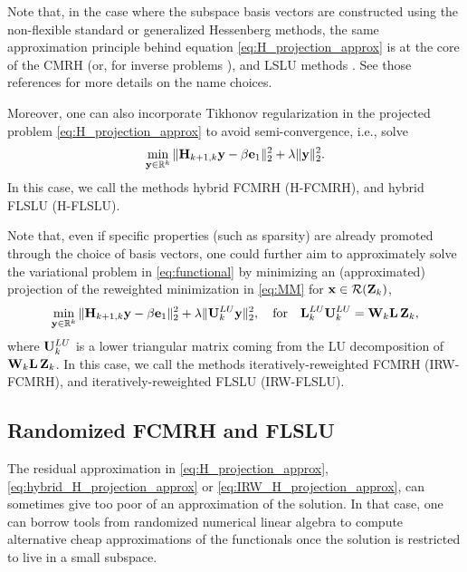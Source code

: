 \documentclass[11pt]{article}
\numberwithin{equation}{section}
\newcommand{\bfA}{{\bf A}}
\newcommand{\bfH}{{\bf H}}
\newcommand{\bfL}{{\bf L}}
\newcommand{\bfU}{{\bf U}}
\newcommand{\bfW}{{\bf W}}
\newcommand{\bfZ}{{\bf Z}}
\newcommand{\bfb}{{\bf b}}
\newcommand{\bfe}{{\bf e}}
\newcommand{\bfx}{{\bf x}}
\newcommand{\bfy}{{\bf y}}
\begin{document}
Note that, in the case where the subspace basis vectors are constructed using the non-flexible standard or generalized Hessenberg methods, the same approximation principle behind equation \eqref{eq:H_projection_approx} is at the core of the CMRH \cite{sadok1999new,sadok2012new} (or, for inverse problems \cite{brown2024hcmrh}), and LSLU methods \cite{brown2025hlslu}. See those references for more details on the name choices.

Moreover, one can also incorporate Tikhonov regularization in the projected problem \eqref{eq:H_projection_approx} to avoid semi-convergence, i.e., solve
\begin{equation}\label{eq:hybrid_H_projection_approx}
   \min_{\bfy\in\mathbb{R}^k} \| \bfH_{k+1,k}\bfy -\beta \bfe_1 \|_2^2+\lambda\|\bfy\|_2^2.
\end{equation}
In this case, we call the methods hybrid FCMRH (H-FCMRH), and hybrid FLSLU (H-FLSLU).

Note that, even if specific properties (such as sparsity) are already promoted through the choice of basis vectors, one could further aim to approximately solve the variational problem in \eqref{eq:functional} by minimizing an (approximated) projection of the reweighted minimization in \eqref{eq:MM} for $\bfx \in \mathcal{R}(\bfZ_k)$,
\begin{equation}\label{eq:IRW_H_projection_approx}
   \min_{\bfy\in\mathbb{R}^k} \| \bfH_{k+1,k}\bfy -\beta \bfe_1 \|_2^2+\lambda\|\bfU^{LU}_k\bfy\|_2^2, \quad \text{for} \quad \bfL^{LU}_k\bfU^{LU}_k = \bfW_k \bfL\,\bfZ_k,
\end{equation}
where $\bfU^{LU}_k$ is a lower triangular matrix coming from the LU decomposition of $\bfW_k \bfL\,\bfZ_k$.
In this case, we call the methods iteratively-reweighted FCMRH (IRW-FCMRH), and iteratively-reweighted FLSLU (IRW-FLSLU).

\subsection{Randomized FCMRH and FLSLU}
The residual approximation in \eqref{eq:H_projection_approx},  \eqref{eq:hybrid_H_projection_approx} or \eqref{eq:IRW_H_projection_approx}, can sometimes give too poor of an approximation of the solution. In that case, one can borrow tools from randomized numerical linear algebra to compute alternative cheap approximations of the functionals once the solution is restricted to live in a small subspace. 
\end{document}
